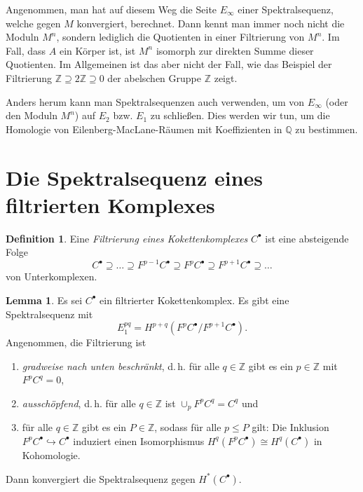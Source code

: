 \documentclass[11pt, a4paper, german]{article}
\theoremstyle{definition}
\newtheorem{lem}{Lemma}
\newtheorem{defn}{Definition}
\theoremstyle{remark}
\newcommand{\Z}{\mathbb{Z}} %
\newcommand{\Q}{\mathbb{Q}} %
\newcommand{\ES}{Es sei} %
\renewcommand{\dh}{d.\,h.} %
\begin{document}
Angenommen, man hat auf diesem Weg die Seite $E_\infty$ einer Spektralsequenz, welche gegen $M$ konvergiert, berechnet.
Dann kennt man immer noch nicht die Moduln $M^n$, sondern lediglich die Quotienten in einer Filtrierung von $M^n$.
Im Fall, dass $A$ ein Körper ist, ist $M^n$ isomorph zur direkten Summe dieser Quotienten.
Im Allgemeinen ist das aber nicht der Fall, wie das Beispiel der Filtrierung $\Z \supseteq 2 \Z \supseteq 0$ der abelschen Gruppe $\Z$ zeigt.

Anders herum kann man Spektralsequenzen auch verwenden, um von $E_\infty$ (oder den Moduln $M^n$) auf $E_2$ bzw. $E_1$ zu schließen.
Dies werden wir tun, um die Homologie von Eilenberg-MacLane-Räumen mit Koeffizienten in $\Q$ zu bestimmen.

\section{Die Spektralsequenz eines filtrierten Komplexes}


\begin{defn}
  Eine \emph{Filtrierung eines Kokettenkomplexes} $C^\bullet$ ist eine absteigende Folge
  \[ C^\bullet \supseteq \ldots \supseteq F^{p-1} C^\bullet \supseteq F^p C^\bullet \supseteq F^{p+1} C^\bullet \supseteq \ldots \]
 von Unterkomplexen.
\end{defn}


\begin{lem}
  \ES{} $C^\bullet$ ein filtrierter Kokettenkomplex.
  Es gibt eine Spektralsequenz mit
  \[ E_1^{pq} = H^{p+q}(F^p C^\bullet / F^{p+1} C^\bullet). \]
  Angenommen, die Filtrierung ist
  \begin{enumerate}[label=\alph*)]
    \item \emph{gradweise nach unten beschränkt}, \dh{} für alle $q \in \Z$ gibt es ein $p \in \Z$ mit $F^p C^q = 0$,
    \item \emph{ausschöpfend}, \dh{} für alle $q \in \Z$ ist $\cup_p F^p C^q = C^q$ und %
    \item für alle $q \in \Z$ gibt es ein $P \in \Z$, sodass für alle $p \leq P$ gilt: Die Inklusion $F^p C^\bullet \hookrightarrow C^\bullet$ induziert einen Isomorphismus $H^q (F^p C^\bullet) \cong H^q(C^\bullet)$ in Kohomologie.
  \end{enumerate}
  Dann konvergiert die Spektralsequenz gegen $H^*(C^\bullet)$.
\end{lem}
\end{document}
